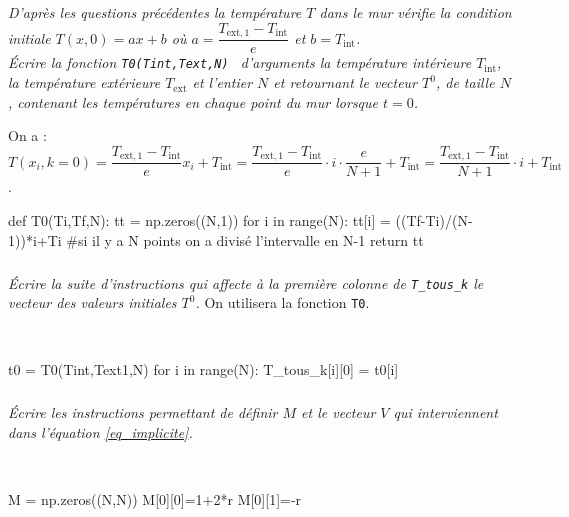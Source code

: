\documentclass[10pt,fleqn]{article} %
\begin{document}
\begin{multicols}{2}
\subparagraph{}
\textit{D'après les questions précédentes la température $T$ dans le mur vérifie la condition
 initiale  $T(x,0)=ax+b$ où 
 $a=\dfrac{T_{\text{ext},1}-T_{\text{int}}}{e}$  et  $b=T_{\text{int}}$.\\
Écrire la fonction \texttt{T0(Tint,Text,N) } d'arguments la température intérieure $T_{\text{int}}$, 
la température extérieure $T_{\text{ext}}$ et l'entier $N$ et retournant le vecteur $T^0$, de taille $N$,
contenant les températures en chaque point du mur lorsque $t=0$. }
\ifprof
\begin{corrige} 
On a : $T(x_i,k=0)=\dfrac{T_{\text{ext},1}-T_{\text{int}}}{e}x_i + T_{\text{int}} = \dfrac{T_{\text{ext},1}-T_{\text{int}}}{e}\cdot i \cdot \dfrac{e}{N+1} + T_{\text{int}} =  \dfrac{T_{\text{ext},1}-T_{\text{int}}}{N+1}\cdot i  + T_{\text{int}}$.
~\\
\begin{python}
def T0(Ti,Tf,N):
    tt =  np.zeros((N,1))
    for i in range(N):
        tt[i] = ((Tf-Ti)/(N-1))*i+Ti #si il y a N points on a divisé l'intervalle en N-1
    return tt
\end{python}
\end{corrige}
\else
\fi



\subparagraph{}
\textit{Écrire la suite d'instructions qui affecte à la première colonne de \texttt{T\_tous\_k} 
 le vecteur des valeurs initiales $T^0$. }
 On utilisera la fonction \texttt{T0}. 
\ifprof
\begin{corrige}~\\

\begin{python}
t0 = T0(Tint,Text1,N)
for i in range(N):
    T_tous_k[i][0] = t0[i]
\end{python}
\end{corrige}
\else
\fi



\subparagraph{}
\textit{Écrire les instructions permettant de définir $M$ et le vecteur $V$ qui interviennent dans l'équation \ref{eq_implicite}. }
\ifprof
\begin{corrige} ~\\
\begin{python}
M = np.zeros((N,N))
M[0][0]=1+2*r
M[0][1]=-r


\end{python}
\end{corrige}
\end{multicols}
\end{document}
